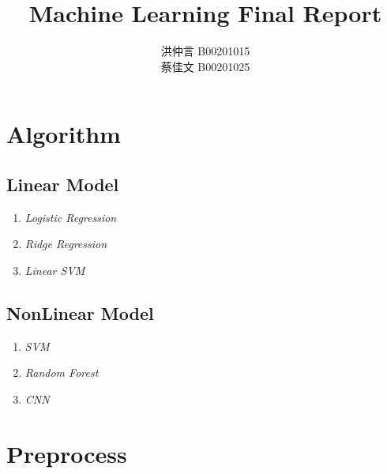 \documentclass[12pt]{article}
\theoremstyle{definition}
\theoremstyle{remark}
\begin{document}

\title{Machine Learning Final Report}
\author{洪仲言 B00201015\\
蔡佳文 B00201025}
\maketitle
\section{Algorithm}
\subsection{Linear Model}
\begin{enumerate}
  \item {\em Logistic Regression\/}
  \item {\em Ridge Regression\/}
  \item {\em Linear SVM\/}
\end{enumerate}
\subsection{NonLinear Model}
\begin{enumerate}
  \item {\em SVM\/}
  \item {\em Random Forest\/}
  \item {\em CNN\/}
\end{enumerate}
\section{Preprocess}
\end{document}
